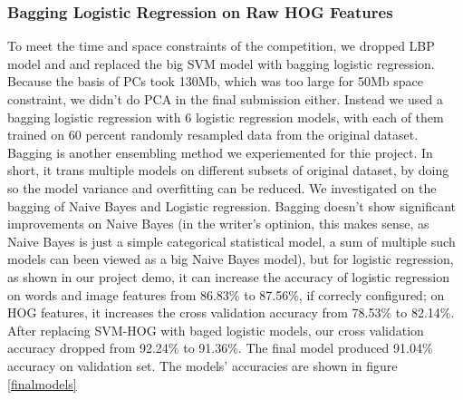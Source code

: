 \subsubsection{Bagging Logistic Regression on Raw HOG Features}
To meet the time and space constraints of the competition, we dropped LBP model and and replaced the big SVM model with bagging logistic regression. Because the basis of PCs took 130Mb, which was too large for 50Mb space constraint, we didn't do PCA in the final submission either. Instead we used a bagging logistic regression with 6 logistic regression  models, with each of them trained on 60 percent randomly resampled data from the original dataset. Bagging is another ensembling method we experiemented for thie project. In short, it trans multiple models on different subsets of original dataset, by doing so the model variance and overfitting can be reduced. We investigated on the bagging of Naive Bayes and Logistic regression. Bagging doesn't show significant improvements on Naive Bayes (in the writer's optinion, this makes sense, as Naive Bayes is just a simple categorical statistical model, a sum of multiple such models can been viewed as a big Naive Bayes model), but for logistic regression, as shown in our project demo, it can increase the accuracy of logistic regression on words and image features from 86.83\% to 87.56\%, if correcly configured; on HOG features, it increases the cross validation accuracy from 78.53\% to 82.14\%.  After replacing SVM-HOG with baged logistic models, our cross validation accuracy dropped from 92.24\% to 91.36\%. The final model produced 91.04\% accuracy on validation set. The models' accuracies are shown in figure \ref{finalmodels}

